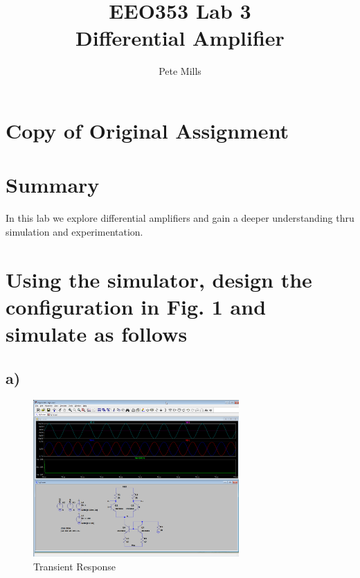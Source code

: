 \documentclass{article}
\begin{document}
	
	
	\title{EEO353 Lab 3\\ Differential Amplifier}
	\author{Pete Mills}
	
	\maketitle
	
	\section*{Copy of Original Assignment}
	
	
	
	
	\section*{Summary}
	
	In this lab we explore differential amplifiers and gain a deeper understanding thru simulation and experimentation.
	

	\section{Using the simulator, design the configuration in Fig. 1 and simulate as follows}
	
	\subsection*{a)}

	\begin{figure}[H]
	    \centering
	    \includegraphics[width=0.7\textwidth]{1a-1}
	    \caption{Transient Response}
	\end{figure}
	
\end{document}
